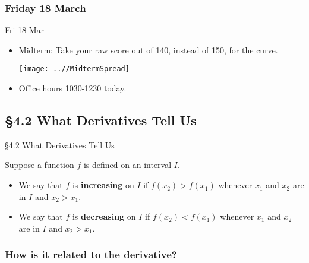 \documentclass[cal1spr16Lectures.tex]{subfiles}
\begin{document}

\subsubsection{\bf Friday 18 March}

\begin{frame}[allowframebreaks]{Fri 18 Mar}
\begin{itemize}\footnotesize
\item Midterm: Take your raw score out of 140, instead of 150, for the curve.

\begin{center}
\texttt{[image: ..//MidtermSpread]}
\end{center}

\item Office hours 1030-1230 today.
\end{itemize}
\end{frame}

\subsection[4.2 What Derivatives Tell Us]{\S 4.2 What Derivatives Tell Us}

\begin{frame}{\S 4.2 What Derivatives Tell Us}
\begin{dfn} Suppose a function $f$ is defined on an interval $I$.
\begin{itemize}
\item We say that $f$ is {\bf increasing} on $I$ if $f(x_2)>f(x_1)$ whenever $x_1$ and $x_2$ are in $I$ and $x_2 > x_1$.
\item We say that $f$ is {\bf decreasing} on $I$ if $f(x_2)<f(x_1)$ whenever $x_1$ and $x_2$ are in $I$ and $x_2 > x_1$.
\end{itemize}
\end{dfn}
\end{frame}

\subsubsection{How is it related to the derivative?}
\end{document}
